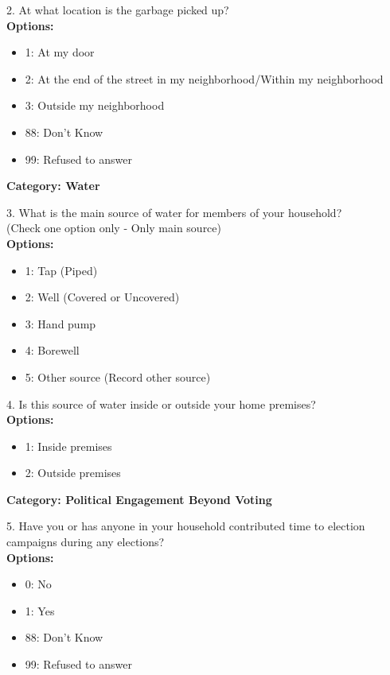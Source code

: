 2. At what location is the garbage picked up? \\
   \textbf{Options:}
   \begin{itemize}
       \item 1: At my door
       \item 2: At the end of the street in my neighborhood/Within my neighborhood
       \item 3: Outside my neighborhood
       \item 88: Don’t Know
       \item 99: Refused to answer
   \end{itemize}

\textbf{Category: Water}

3. What is the main source of water for members of your household? \\
   (Check one option only - Only main source) \\
   \textbf{Options:}
   \begin{itemize}
       \item 1: Tap (Piped)
       \item 2: Well (Covered or Uncovered)
       \item 3: Hand pump
       \item 4: Borewell
       \item 5: Other source (Record other source)
   \end{itemize}

4. Is this source of water inside or outside your home premises? \\
   \textbf{Options:}
   \begin{itemize}
       \item 1: Inside premises
       \item 2: Outside premises
   \end{itemize}

\textbf{Category: Political Engagement Beyond Voting}

5. Have you or has anyone in your household contributed time to election campaigns during any elections? \\
   \textbf{Options:}
   \begin{itemize}
       \item 0: No
       \item 1: Yes
       \item 88: Don’t Know
       \item 99: Refused to answer
   \end{itemize}

